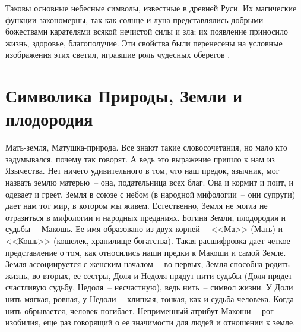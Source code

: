 \documentclass[pscyr,chapters]{hedwork}
\begin{document}
  Таковы основные небесные символы, известные в древней Руси. Их магические
  функции закономерны, так как солнце и луна представлялись добрыми божествами
  карателями всякой нечистой силы и зла; их появление приносило жизнь, здоровье,
  благополучие. Эти свойства были перенесены на условные изображения этих
  светил, игравшие роль чудесных оберегов \cite{1}.

  \chapter{Символика Природы, Земли и плодородия}

  Мать-земля, Матушка-природа. Все знают такие словосочетания, но мало кто
  задумывался, почему так говорят. А ведь это выражение пришло к нам из
  Язычества. Нет ничего удивительного в том, что наш предок, язычник, мог
  назвать землю матерью~-- она, подательница всех благ. Она и кормит и поит, и
  одевает и греет. Земля в союзе с небом (в народной мифологии~-- они супруги)
  дает нам тот мир, в котором мы живем. Естественно, Земля не могла не
  отразиться в мифологии и народных преданиях. Богиня Земли, плодородия и
  судьбы~-- Макошь. Ее имя образовано из двух корней~-- <<Ма>> (Мать) и <<Кошь>>
  (кошелек, хранилище богатства). Такая расшифровка дает четкое представление о
  том, как относились наши предки к Макоши и самой Земле. Земля ассоциируется с
  женским началом~-- во-первых, Земля способна родить жизнь, во-вторых, ее
  сестры, Доля и Недоля прядут нити судьбы (Доля прядет счастливую судьбу,
  Недоля~-- несчастную), ведь нить~-- символ жизни. У Доли нить мягкая, ровная,
  у Недоли~-- хлипкая, тонкая, как и судьба человека. Когда нить обрывается,
  человек погибает. Неприменный атрибут Макоши~-- рог изобилия, еще раз
  говорящий о ее значимости для людей и отношении к земле.
\end{document}
